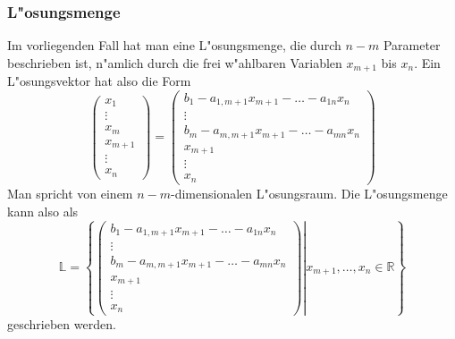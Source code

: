 \subsubsection{L"osungsmenge}
Im vorliegenden Fall hat man eine L"osungsmenge, die durch $n-m$
Parameter beschrieben ist, n"amlich durch die frei w"ahlbaren
Variablen $x_{m+1}$ bis $x_n$.
Ein L"osungsvektor hat also die
Form 
\[
\begin{pmatrix}
x_1\\\vdots\\x_m\\x_{m+1}\\\vdots\\x_n
\end{pmatrix}
=
\begin{pmatrix}
b_1-a_{1,m+1}x_{m+1}-\dots-a_{1n}x_n\\
\vdots\\
b_m-a_{m,m+1}x_{m+1}-\dots-a_{mn}x_n\\
x_{m+1}\\
\vdots\\
x_n
\end{pmatrix}
\]
Man spricht von einem $n-m$-dimensionalen L"osungsraum.
Die L"osungsmenge kann also als
\[
\mathbb L
=
\left\{
\left.
\begin{pmatrix}
b_1-a_{1,m+1}x_{m+1}-\dots-a_{1n}x_n\\
\vdots\\
b_m-a_{m,m+1}x_{m+1}-\dots-a_{mn}x_n\\
x_{m+1}\\
\vdots\\
x_n
\end{pmatrix}
\right|
x_{m+1},\dots,x_n\in\mathbb R
\right\}
\]
geschrieben werden.
